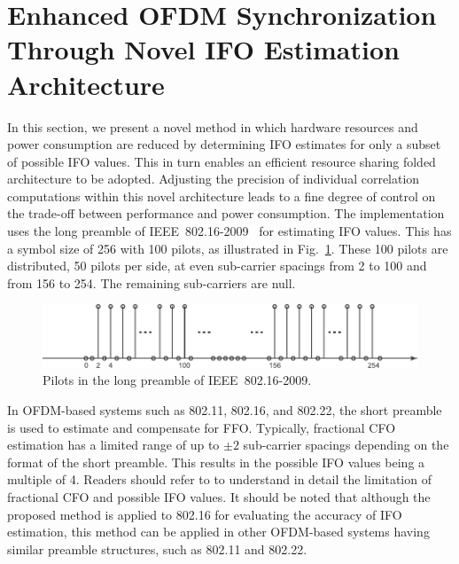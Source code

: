 \section{Enhanced OFDM Synchronization Through Novel IFO Estimation Architecture}
In this section, we present a novel method in which hardware resources and power consumption are reduced by determining IFO estimates for only a subset of possible IFO values. This in turn enables an efficient resource sharing folded architecture to be adopted. Adjusting the precision of individual correlation computations within this novel architecture leads to a fine degree of control on the trade-off between performance and power consumption.
The implementation uses the long preamble of IEEE~802.16-2009~\cite{IEEE80216} for estimating IFO values.
This has a symbol size of 256 with 100 pilots, as illustrated in Fig.~\ref{fig:long_pre}.
These 100 pilots are distributed, 50 pilots per side, at even sub-carrier spacings from 2 to 100 and from 156 to 254. The remaining sub-carriers are null.
\begin{figure}[b]
    \centerline{\includegraphics [width=1\columnwidth] {figures/long_pre.pdf} }
    \caption{Pilots in the long preamble of IEEE~802.16-2009.}
    \label{fig:long_pre}
\end{figure}
In OFDM-based systems such as 802.11, 802.16, and 802.22, the short preamble is used to estimate and compensate for FFO.
Typically, fractional CFO estimation has a limited range of up to ${\pm}2$ sub-carrier spacings depending on the format of the short preamble.
This results in the possible IFO values being a multiple of 4. Readers should refer to \cite{Kim2008} to understand in detail the limitation of fractional CFO and possible IFO values.
It should be noted that although the proposed method is applied to 802.16 for evaluating the accuracy of IFO estimation, this method can be applied in other OFDM-based systems having similar preamble structures, such as 802.11 and 802.22.

